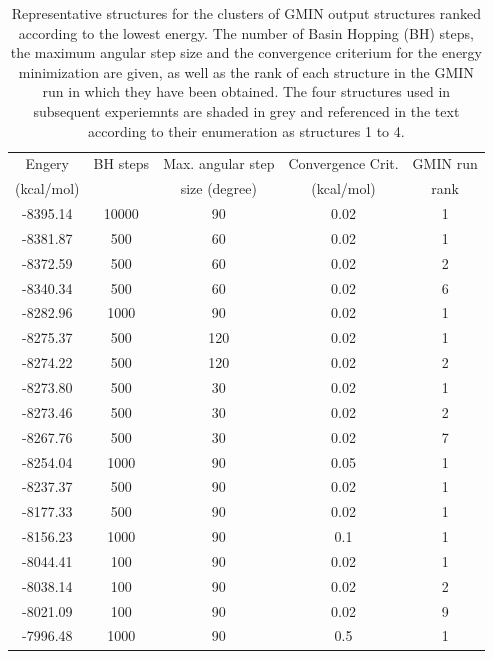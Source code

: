 \documentclass[english, a4paper, 12pt, titlepage, draft]{article}
\begin{document}
 

\begin{table}
\centering
\begin{tabular}{c c c c c}
    \hline \hline
    Engery     & BH steps & Max. angular step & Convergence Crit. & GMIN run \\ 
    (kcal/mol) &          & size (degree)     & (kcal/mol)        & rank     \\
    \hline
    \rowcolor{lightgray}
    -8395.14   & 10000    &  90               & 0.02              & 1        \\ 
    \rowcolor{lightgray}
    -8381.87   &   500    &  60               & 0.02              & 1        \\
    -8372.59   &   500    &  60               & 0.02              & 2        \\
    \rowcolor{lightgray}
    -8340.34   &   500    &  60               & 0.02              & 6        \\
    -8282.96   &  1000    &  90               & 0.02              & 1        \\
    \rowcolor{lightgray}
    -8275.37   &   500    & 120               & 0.02              & 1        \\
    -8274.22   &   500    & 120               & 0.02              & 2        \\
    -8273.80   &   500    &  30               & 0.02              & 1        \\
    -8273.46   &   500    &  30               & 0.02              & 2        \\
    -8267.76   &   500    &  30               & 0.02              & 7        \\
    -8254.04   &  1000    &  90               & 0.05              & 1        \\
    -8237.37   &   500    &  90               & 0.02              & 1        \\
    -8177.33   &   500    &  90               & 0.02              & 1        \\
    -8156.23   &  1000    &  90               & 0.1               & 1        \\
    -8044.41   &   100    &  90               & 0.02              & 1        \\
    -8038.14   &   100    &  90               & 0.02              & 2        \\
    -8021.09   &   100    &  90               & 0.02              & 9        \\
    -7996.48   &  1000    &  90               & 0.5               & 1        \\
    \hline \hline
\end{tabular}
\caption{Representative structures for the clusters of GMIN output structures ranked according to the lowest energy.
The number of Basin Hopping (BH) steps, the maximum angular step size and the convergence criterium for the energy minimization are given, as well as the rank of each structure in the GMIN run in which they have been obtained.
    The four structures used in subsequent experiemnts are shaded in grey and referenced in the text according to their enumeration as structures 1 to 4.}
\label{tab:GMIN_structures}
\end{table} 
\end{document}
